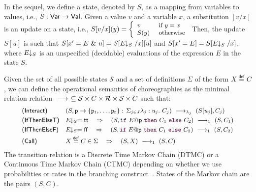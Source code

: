 \bigskip


 In the sequel, we define a state, denoted by $S$,
as a mapping from variables to values, i.e.,
$S: \mathsf{Var} \rightarrow\mathsf{Val}$. Given a value $v$ and a variable $x$, a
substitution $[v/x]$ is an update on a state, i.e.,
$\small S[v/x] (y)= \left\{
  \begin{array}{ll} 
    v    & \text{ if } y=x\\ 
    S(y) & \text{ otherwise}
  \end{array} \right.
$
%
Then, the update $S[u]$ is such that
$S[x'=E\ \&\ u] = S[E\!\!\downarrow_{S}/x][u]$ and $S[x'=E] = S[E\!\!\downarrow_{S}/x]$,
where $E\!\!\downarrow_{S}$ is an unspecified (decidable) evaluations of the
expression $E$ in the state $S$.

Given the set of all possible states $\mathcal S$ and a set of
definitions $\Sigma$ of the form $X\stackrel{\mathsf{def}}{=} C$, we
can define the operational semantics of choreographies as the minimal
relation relation
$\ \longrightarrow_{}\ \subseteq \mathcal S\times C\times \mathcal R\times \mathcal
S\times C$ such that:
\begin{displaymath}\small
  \begin{array}{l@{\quad}llll}
    \textsf{(Interact)} &
    (S, \interact{p}{\role p_1,\ldots,\role p_n}) 
    \red{\lambda_j}
    (S[u_j], C_j) 
    \\[1mm]
    \textsf{(IfThenElseT)} &
    \eval ES = \mathsf{tt} \quad\Rightarrow\quad
    (S,\ifTE {E}{p}{C_1}{C_2}) 
    \red{1}
    (S, C_1)
    \\[1mm]
    \textsf{(IfThenElseF)} &
    \eval ES = \mathsf{ff} \quad\Rightarrow\quad
    (S,\ifTE {E}{p}{C_1}{C_2}) 
    \red{1}
    (S, C_2)
    \\[1mm]
    \textsf{(Call)} &
    X\stackrel{\mathsf{def}}{=} C\in\Sigma \quad\Rightarrow\quad (S, X) \red{1}(S,C)
  \end{array}
\end{displaymath}
The transition relation is a
Discrete Time Markov Chain (DTMC) or a Continuous Time Markov Chain
(CTMC) depending on whether we use probabilities or rates in the
branching construct~\cite{ctmc}. States of the Markov chain are the
pairs $(S,C)$.
%

